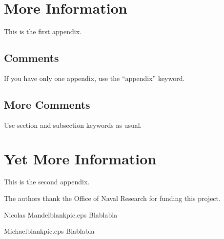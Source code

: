 \documentclass[twocolumn,letterpaper]{IEEEAerospaceCLS}  %
\begin{document}
\section{More Information}        %
This is the first appendix. 

\subsection{Comments}
If you have only one appendix, use the ``appendix'' keyword.

\subsection{More Comments}
Use section and subsection keywords as usual.

\section{Yet More Information}    %
This is the second appendix.



\acknowledgments
The authors thank the Office of Naval Research for funding this project.







\thebiography
\begin{biographywithpic}{Nicolas Mandel}{blankpic.eps}
Blablabla
\end{biographywithpic} 

\begin{biographywithpic}{Michael}{blankpic.eps}
Blablabla
\end{biographywithpic}
\end{document}
